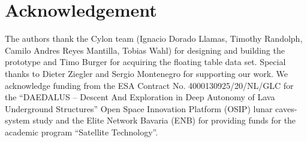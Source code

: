 \section*{Acknowledgement}

The authors thank the Cylon team (Ignacio Dorado Llamas, Timothy Randolph, Camilo Andres Reyes Mantilla, Tobias Wahl) for designing and building the prototype and Timo Burger for acquiring the floating table data set.
Special thanks to Dieter Ziegler and Sergio Montenegro for supporting our work.
We acknowledge funding from the ESA Contract No. 4000130925/20/NL/GLC for the ``DAEDALUS -- Descent And Exploration in Deep Autonomy of Lava Underground Structures'' Open Space Innovation Platform (OSIP) lunar caves-system study and the Elite Network Bavaria (ENB) for providing funds for the academic program ``Satellite Technology''.
